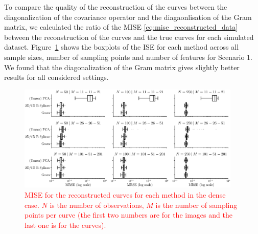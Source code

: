 \begin{results}
To compare the quality of the reconstruction of the curves between the diagonalization of the covariance operator and the diagaonlisation of the Gram matrix, we calculated the ratio of the MISE \eqref{eq:mise_reconstructed_data} between the reconstruction of the curves and the true curves for each simulated dataset.
Figure~\ref{fig:mise_mfd_1d} shows the boxplots of the ISE for each method across all sample sizes, number of sampling points and number of features for Scenario 1. We found that the diagonalization of the Gram matrix gives slightly better results for all considered settings.
\begin{figure}
     \centering
     \includegraphics[width=0.95\textwidth]{figures/MRSE.eps}
    \caption{\textcolor{red}{MISE for the reconstructed curves for each method in the dense case. $N$ is the number of observations, $M$ is the number of sampling points per curve (the first two numbers are for the images and the last one is for the curves).}}
    \label{fig:mise_mfd_1d}
\end{figure}
\end{results}




